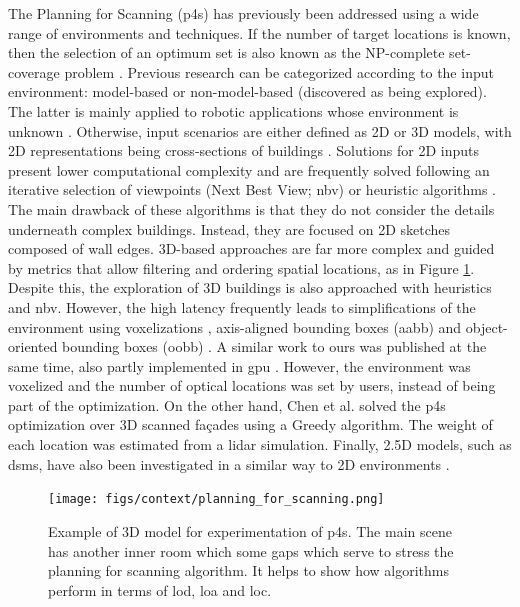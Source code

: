 The Planning for Scanning (\acrshort{p4s}) has previously been addressed using a wide range of environments and techniques. If the number of target locations is known, then the selection of an optimum set is also known as the NP-complete set-coverage problem \cite{li_probability_2021, mohamadi_efficient_2021, roostapour_pareto_2022}. Previous research can be categorized according to the input environment: model-based or non-model-based (discovered as being explored). The latter is mainly applied to robotic applications whose environment is unknown \cite{potthast_probabilistic_2014}. Otherwise, input scenarios are either defined as 2D or 3D models, with 2D representations being cross-sections of buildings \cite{giorgini_sensor-based_2019}. Solutions for 2D inputs present lower computational complexity and are frequently solved following an iterative selection of viewpoints (Next Best View; \acrshort{nbv}) or heuristic algorithms \cite{aryan_planning_2021}. The main drawback of these algorithms is that they do not consider the details underneath complex buildings. Instead, they are focused on 2D sketches composed of wall edges. 3D-based approaches are far more complex and guided by metrics that allow filtering and ordering spatial locations, as in Figure \ref{fig:planning_for_scanning_room}. Despite this, the exploration of 3D buildings is also approached with heuristics and \acrshort{nbv}. However, the high latency frequently leads to simplifications of the environment using voxelizations \cite{wakisaka_optimal_2019, rougeron_optimal_2022}, axis-aligned bounding boxes (\acrshort{aabb}) and object-oriented bounding boxes (\acrshort{oobb}) \cite{li_3d_2022}. A similar work to ours was published at the same time, also partly implemented in \acrshort{gpu} \cite{rougeron_optimal_2022}. However, the environment was voxelized and the number of optical locations was set by users, instead of being part of the optimization. On the other hand, Chen et al. \cite{chen_3d_2022} solved the \acrshort{p4s} optimization over 3D scanned façades using a Greedy algorithm. The weight of each location was estimated from a \acrshort{lidar} simulation. Finally, 2.5D models, such as \acrshort{dsm}s, have also been investigated in a similar way to 2D environments \cite{starek_viewshed_2020}.

\begin{figure}[ht]
	\texttt{[image: figs/context/planning\_for\_scanning.png]}
	\caption{Example of 3D model for experimentation of \acrshort{p4s}. The main scene has another inner room which some gaps which serve to stress the planning for scanning algorithm. It helps to show how algorithms perform in terms of \acrshort{lod}, \acrshort{loa} and \acrshort{loc}.}
    \label{fig:planning_for_scanning_room}
\end{figure}

